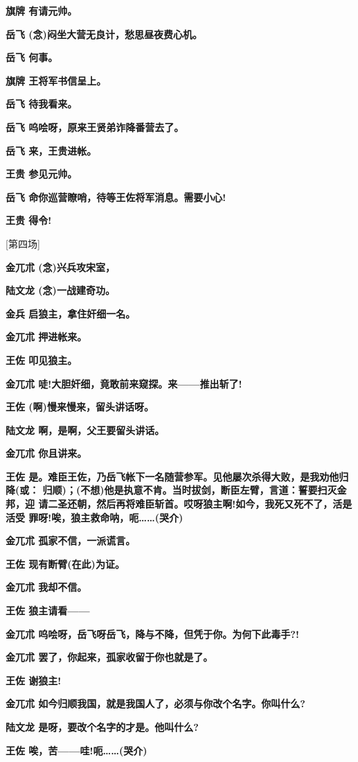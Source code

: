 \textbf{旗牌 有请元帅。}

\textbf{岳飞 (念)闷坐大营无良计，愁思昼夜费心机。}

\textbf{岳飞 何事。}

\textbf{旗牌 王将军书信呈上。}

\textbf{岳飞 待我看来。}

\textbf{岳飞 呜哙呀，原来王贤弟诈降番营去了。}

\textbf{岳飞 来，王贵进帐。}

\textbf{王贵 参见元帅。}

\textbf{岳飞 命你巡营瞭哨，待等王佐将军消息。需要小心!}

\textbf{王贵 得令!}

{[}第四场{]}

\textbf{金兀朮 (念)兴兵攻宋室，}

\textbf{陆文龙 (念)一战建奇功。}

\textbf{金兵 启狼主，拿住奸细一名。}

\textbf{金兀朮 押进帐来。}

\textbf{王佐 叩见狼主。}

\textbf{金兀朮 唗!大胆奸细，竟敢前来窥探。来------推出斩了!}

\textbf{王佐 (啊)慢来慢来，留头讲话呀。}

\textbf{陆文龙 啊，是啊，父王要留头讲话。}

\textbf{金兀朮 你且讲来。}

\textbf{王佐
是。难臣王佐，乃岳飞帐下一名随营参军。见他屡次杀得大败，是我劝他归降(或：
归顺)；(不想)他是执意不肯。当时拔剑，断臣左臂，言道：誓要扫灭金邦，迎
请二圣还朝，然后再将难臣斩首。哎呀狼主啊!如今，我死又死不了，活是活受
罪呀!唉，狼主救命呐，呃\ldots{}\ldots{}(哭介)}

\textbf{金兀朮 孤家不信，一派谎言。}

\textbf{王佐 现有断臂(在此)为证。}

\textbf{金兀朮 我却不信。}

\textbf{王佐 狼主请看------}

\textbf{金兀朮 呜哙呀，岳飞呀岳飞，降与不降，但凭于你。为何下此毒手?!}

\textbf{金兀朮 罢了，你起来，孤家收留于你也就是了。}

\textbf{王佐 谢狼主!}

\textbf{金兀朮 如今归顺我国，就是我国人了，必须与你改个名字。你叫什么?}

\textbf{陆文龙 是呀，要改个名字的才是。他叫什么?}

\textbf{王佐 唉，苦------哇!呃\ldots{}\ldots{}(哭介)}

